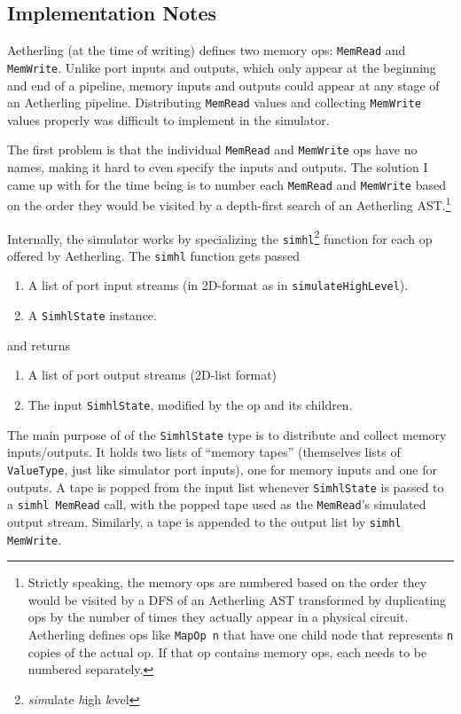 \documentclass[12pt]{article}
\begin{document}
\subsection{Implementation Notes}

Aetherling (at the time of writing) defines two memory ops:
\texttt{MemRead} and \texttt{MemWrite}. Unlike port inputs and
outputs, which only appear at the beginning and end of a pipeline,
memory inputs and outputs could appear at any stage of an Aetherling
pipeline. Distributing \texttt{MemRead} values and collecting
\texttt{MemWrite} values properly was difficult to implement in the
simulator.

The first problem is that the individual \texttt{MemRead} and
\texttt{MemWrite} ops have no names, making it hard to even specify
the inputs and outputs. The solution I came up with for the time being
is to number each \texttt{MemRead} and \texttt{MemWrite} based on the
order they would be visited by a depth-first search of an Aetherling
AST.\footnote{Strictly speaking, the memory ops are numbered based on
  the order they would be visited by a DFS of an Aetherling AST
  transformed by duplicating ops by the number of times they actually
  appear in a physical circuit. Aetherling defines ops like
  \texttt{MapOp n} that have one child node that represents \texttt{n}
  copies of the actual op. If that op contains memory ops, each needs
  to be numbered separately.}

Internally, the simulator works by specializing the
\texttt{simhl}\footnote{ \textit{sim}ulate \textit{h}igh
  \textit{l}evel} function for each op offered by Aetherling.
The \texttt{simhl} function gets passed

\begin{enumerate}
\item A list of port input streams (in 2D-format as in \texttt{simulateHighLevel}).
\item A \texttt{SimhlState} instance.
\end{enumerate}

and returns

\begin{enumerate}
\item A list of port output streams (2D-list format)
\item The input \texttt{SimhlState}, modified by the op and its children.
\end{enumerate}

The main purpose of of the \texttt{SimhlState} type is to distribute
and collect memory inputs/outputs. It holds two lists of ``memory
tapes'' (themselves lists of \texttt{ValueType}, just like simulator
port inputs), one for memory inputs and one for outputs. A tape is
popped from the input list whenever \texttt{SimhlState} is passed to a
\texttt{simhl MemRead} call, with the popped tape used as the
\texttt{MemRead}'s simulated output stream. Similarly, a tape is appended to
the output list by \texttt{simhl MemWrite}.
\end{document}
